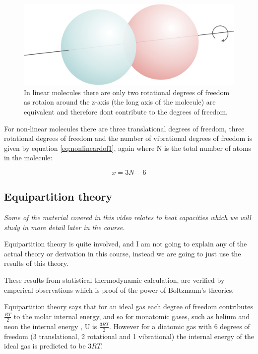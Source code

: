 \documentclass[
]{book}
\begin{document}
\begin{figure}

{\centering \includegraphics[width=0.8\linewidth]{images/linear} 

}

\caption{In linear molecules there are only two rotational degrees of freedom as rotaion around the z-axis (the long axis of the molecule) are equivalent and therefore dont contribute to the degrees of freedom.}\label{fig:linear1}
\end{figure}

For non-linear molecules there are three translational degrees of freedom, three rotational degrees of freedom and the number of vibrational degrees of freedom is given by equation \eqref{eq:nonlineardof1}, again where N is the total number of atoms in the molecule:

\begin{equation}
x = 3N-6
\label{eq:nonlineardof1}
\end{equation}

\hypertarget{subsec:equipartition}{%
\subsection{Equipartition theory}\label{subsec:equipartition}}

\emph{Some of the material covered in this video relates to heat capacities which we will study in more detail later in the course.}

Equipartition theory is quite involved, and I am not going to explain any of the actual theory or derivation in this course, instead we are going to just use the results of this theory.

These results from statistical thermodynamic calculation, are verified by emperical observations which is proof of the power of Boltzmann's theories.

Equipartition theory says that for an ideal gas each degree of freedom contributes \(\frac{RT}{2}\) to the molar internal energy, and so for monatomic gases, such as helium and neon the internal energy , U is \(\frac{3RT}{2}\). However for a diatomic gas with 6 degrees of freedom (3 translational, 2 rotational and 1 vibrational) the internal energy of the ideal gas is predicted to be \(3RT\).
\end{document}
